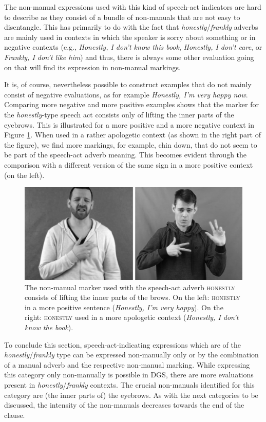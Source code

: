 The non-manual expressions used with this kind of speech-act indicators are hard to describe as they consist of a bundle of non-manuals that are not easy to disentangle. This has primarily to do with the fact that \textit{honestly}/\textit{frankly} adverbs are mainly used in contexts in which the speaker is sorry about something or in negative contexts (e.g., \textit{Honestly, I don't know this book}, \textit{Honestly, I don't care}, or \textit{Frankly, I don't like him}) and thus, there is always some other evaluation going on that will find its expression in non-manual markings.

It is, of course, nevertheless possible to construct examples that do not mainly consist of negative evaluations, as for example \textit{Honestly, I'm very happy now}. Comparing more negative and more positive examples shows that the marker for the \textit{honestly}-type speech act consists only of lifting the inner parts of the eyebrows. This is illustrated for a more positive and a more negative context in Figure \ref{fig:honestly}. When used in a rather apologetic context (as shown in the right part of the figure), we find more markings, for example, chin down, that do not seem to be part of the speech-act adverb meaning. This becomes evident through the comparison with a different version of the same sign in a more positive context (on the left). 


\begin{figure}[bt]
\centering
	\includegraphics[width=1.0\textwidth]{honestlysw.jpg}
	\caption{The non-manual marker used with the speech-act adverb \textsc{honestly} consists of lifting the inner parts of the brows. On the left: \textsc{honestly} in a more positive sentence (\textit{Honestly, I'm very happy}). On the right: \textsc{honestly} used in a more apologetic context (\textit{Honestly, I don't know the book}).}
	\label{fig:honestly}
\end{figure}

To conclude this section, speech-act-indicating expressions which are of the \textit{honestly}/\textit{frankly} type can be expressed non-manually only or by the combination of a manual adverb and the respective non-manual marking. While expressing this category only non-manually is possible in DGS, there are more evaluations present in \textit{honestly}/\textit{frankly} contexts. The crucial non-manuals identified for this category are (the inner parts of) the eyebrows. As with the next categories to be discussed, the intensity of the non-manuals decreases towards the end of the clause.

